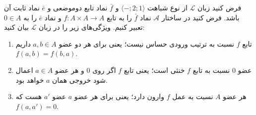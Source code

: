 فرض کنید زبان
$\mathcal{L}$
از نوع شباهت
$\langle\mathord{-};2;1\rangle$
و
$\bar f$
نماد تابع دوموضعی
و
$\bar e$
نماد ثابت آن باشد. فرض کنید در ساختار
$\mathcal{A}$
نماد
$\bar f$
را به تابع
$f\colon A\times A\to A$
و نماد
$\bar e$
را به
$0\in A$
تعبیر کنیم.
ویژگی‌های زیر را در زبان
$\mathcal{L}$
بیان کنید:
\begin{enumerate}[label=(\alph*)]
    \item تابع $f$ نسبت به ترتیب ورودی حساس نیست؛ یعنی برای هر دو عضو
    $a,b\in A$
    داریم $f(a,b)=f(b,a)$.
    \item عضو $0$ نسبت به تابع $f$ خنثی است؛ یعنی تابع $f$ اگر روی
    $0$
    و هر عضو $a\in A$
    اعمال شود خروجی همان $a$ خواهد بود.
    \item هر عضو
    $A$ نسبت به عمل $f$ وارون دارد؛ یعنی برای هر عضو $a$ عضو $a'$ هست که $f(a,a')=0$.
\end{enumerate}

